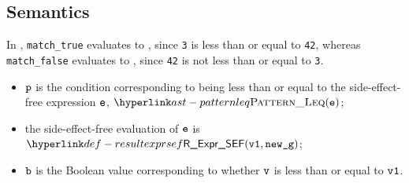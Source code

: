 \FormallyParagraph
\begin{mathpar}
\end{mathpar}

\subsection{Semantics}
In ,
\texttt{match\_true} evaluates to \True, since \texttt{3} is less than or equal to \texttt{42},
whereas \texttt{match\_false} evaluates to \False, since \texttt{42} is not less than or equal to \texttt{3}.

\ProseParagraph
\AllApply
\begin{itemize}
\item $\vp$ is the condition corresponding to being less than or equal
      to the side-effect-free expression $\ve$, $\PatternLeq(\ve)$;
\item the side-effect-free evaluation of $\ve$ is
      $\ResultExprSEF(\vvone, \newg)$\ProseOrDynErrorDiverging;
\item $\vb$ is the Boolean value corresponding to whether $\vv$
      is less than or equal to $\vvone$.
\end{itemize}

